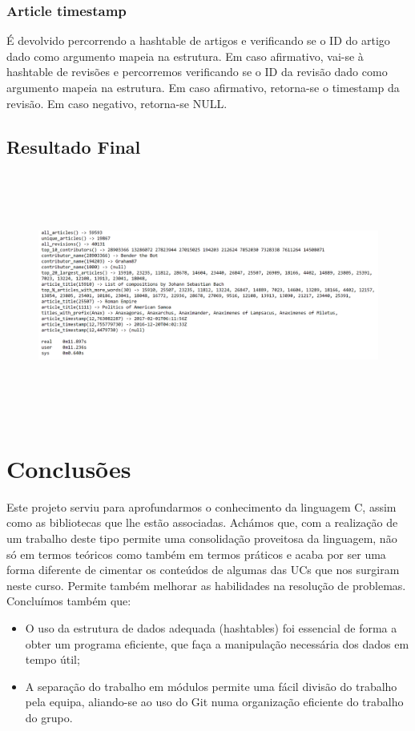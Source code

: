 \documentclass[a4paper]{article}
\begin{document}
\subsubsection{Article timestamp}
É devolvido percorrendo a hashtable de artigos e verificando se o ID do artigo dado como argumento mapeia na estrutura. Em caso afirmativo, vai-se à hashtable de revisões e percorremos verificando se o ID da revisão dado como argumento mapeia na estrutura. Em caso afirmativo, retorna-se o timestamp da revisão. Em caso negativo, retorna-se NULL.

\subsection{Resultado Final}

\begin{figure}[htbp]
    \centering
    \includegraphics[width = 420pt, height = 230pt]{output}
\end{figure}

\section{Conclusões}
\label{sec:conclusao}
Este projeto serviu para aprofundarmos o conhecimento da linguagem C, assim como as bibliotecas que lhe estão associadas. Achámos que, com a realização de um trabalho deste tipo permite uma consolidação proveitosa da linguagem, não só em termos teóricos como também em termos práticos e acaba por ser uma forma diferente de cimentar os conteúdos de algumas das UCs que nos surgiram neste curso. Permite também melhorar as habilidades na resolução de problemas. Concluímos também que:

\begin{itemize}
        \item O uso da estrutura de dados adequada (hashtables) foi essencial de forma a obter um programa eficiente, que faça a manipulação necessária dos dados em tempo útil;
 	    \item A separação do trabalho em módulos permite uma fácil divisão do trabalho pela equipa, aliando-se ao uso do Git numa organização eficiente do trabalho do grupo.
\end{itemize}
\end{document}
